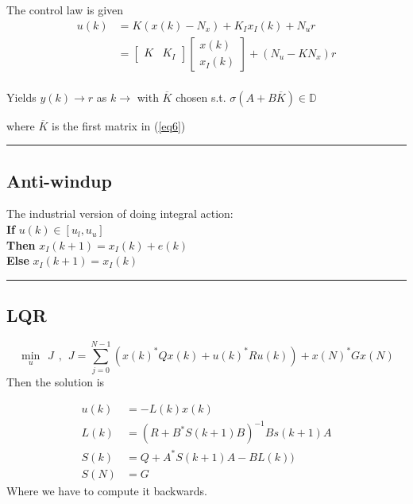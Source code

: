 \documentclass[a4paper]{article}
\begin{document}
The control law is given 
\begin{align}
u(k) &= K(x(k) - N_x) + K_I x_I(k) + N_u r \\
	 &= \begin{bmatrix}
	 K & K_I 
	 \end{bmatrix} \begin{bmatrix}
	 x(k) \\
	 x_I(k)
 \end{bmatrix} + (N_u -K N_x)r \label{eq6} \\
\end{align}

Yields $ y(k) \rightarrow r $ as $ k \rightarrow  $ with $ \overline{K} $ chosen s.t. $ \sigma(A + B \overline{K}) \in \mathbb{D} $ 

where $ \overline{K} $ is the first matrix in (\ref{eq6}) 

\vspace{5pt}
\hrule
\vspace{5pt}
\subsection{Anti-windup}
The industrial version of doing integral action:\\
\textbf{If}  $ u(k) \in [u_l, u_u] $ \\
\textbf{Then} $ x_I(k+1) = x_I(k) + e(k) $ \\
\textbf{Else} $ x_I(k+1) = x_I(k) $

\vspace{5pt}
\hrule
\vspace{5pt}
\subsection{LQR}

\begin{equation}
	\underset{u}{\min} \hspace{5pt} J \hspace{5pt} , \hspace{5pt} J = \sum_{j=0}^{N-1}{(x(k)^{*}Q x(k) + u(k)^{*}R u(k) ) + x(N)^{*} G x(N)}
\end{equation}
Then the solution is

\begin{align}
	u(k) &= -L(k) x(k)\\
	L(k) &= (R+ B^{*} S(k+1) B )^{-1} B s(k+1) A \\
	S(k) &= Q + A^{*} S(k+1) A - B L(k)) \\
	S(N) &= G
\end{align}
Where we have to compute it backwards. 
\end{document}

